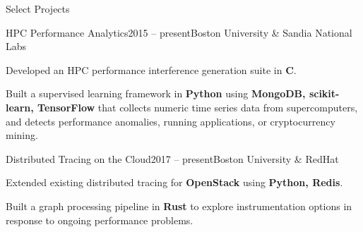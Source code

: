 \documentclass{resume}
\begin{document}
\begin{rSection}{Select Projects}

\begin{rWorksection}{HPC Performance Analytics}{2015 -- present}{Boston
    University \& Sandia National Labs}
\item Developed an HPC performance interference generation suite in {\bf C}.
\item Built a supervised learning framework in {\bf Python} using {\bf MongoDB,
    scikit-learn, TensorFlow} that collects numeric time series data from
  supercomputers, and detects performance anomalies, running applications, or
  cryptocurrency mining.
\end{rWorksection}

\begin{rWorksection}{Distributed Tracing on the Cloud}{2017 -- present}{Boston
    University \& RedHat}
\item Extended existing distributed tracing for {\bf OpenStack} using {\bf
    Python, Redis}.
\item Built a graph processing pipeline in {\bf Rust} to explore
  instrumentation options in response to ongoing performance problems.
\end{rWorksection}

\end{rSection}

\pagebreak

\end{document}
